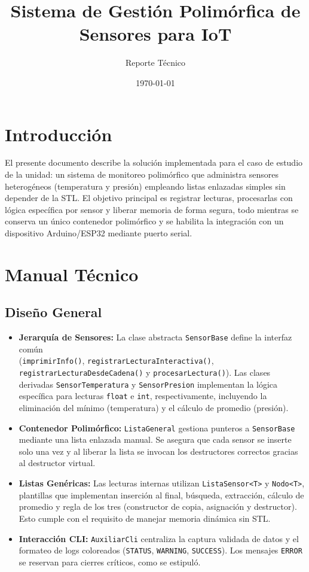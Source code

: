 \documentclass[11pt,a4paper]{article}
\title{Sistema de Gestión Polimórfica de Sensores para IoT}
\author{Reporte Técnico}
\date{\today}
\begin{document}
\maketitle

\section{Introducción}

El presente documento describe la solución implementada para el caso de estudio de la unidad: un sistema de monitoreo polimórfico que administra sensores heterogéneos (temperatura y presión) empleando listas enlazadas simples sin depender de la STL. El objetivo principal es registrar lecturas, procesarlas con lógica específica por sensor y liberar memoria de forma segura, todo mientras se conserva un único contenedor polimórfico y se habilita la integración con un dispositivo Arduino/ESP32 mediante puerto serial.

\section{Manual Técnico}

\subsection{Diseño General}

\begin{itemize}[leftmargin=1.5em]
    \item \textbf{Jerarquía de Sensores:} La clase abstracta \texttt{SensorBase} define la interfaz común \\ (\texttt{imprimirInfo()}, \texttt{registrarLecturaInteractiva()}, \texttt{registrarLecturaDesdeCadena()} y \texttt{procesarLectura()}). Las clases derivadas \texttt{SensorTemperatura} y \texttt{SensorPresion} implementan la lógica específica para lecturas \texttt{float} e \texttt{int}, respectivamente, incluyendo la eliminación del mínimo (temperatura) y el cálculo de promedio (presión).
    \item \textbf{Contenedor Polimórfico:} \texttt{ListaGeneral} gestiona punteros a \texttt{SensorBase} mediante una lista enlazada manual. Se asegura que cada sensor se inserte solo una vez y al liberar la lista se invocan los destructores correctos gracias al destructor virtual.
    \item \textbf{Listas Genéricas:} Las lecturas internas utilizan \texttt{ListaSensor<T>} y \texttt{Nodo<T>}, plantillas que implementan inserción al final, búsqueda, extracción, cálculo de promedio y regla de los tres (constructor de copia, asignación y destructor). Esto cumple con el requisito de manejar memoria dinámica sin STL.
    \item \textbf{Interacción CLI:} \texttt{AuxiliarCli} centraliza la captura validada de datos y el formateo de logs coloreados (\texttt{STATUS}, \texttt{WARNING}, \texttt{SUCCESS}). Los mensajes \texttt{ERROR} se reservan para cierres críticos, como se estipuló.
\end{itemize}
\end{document}
